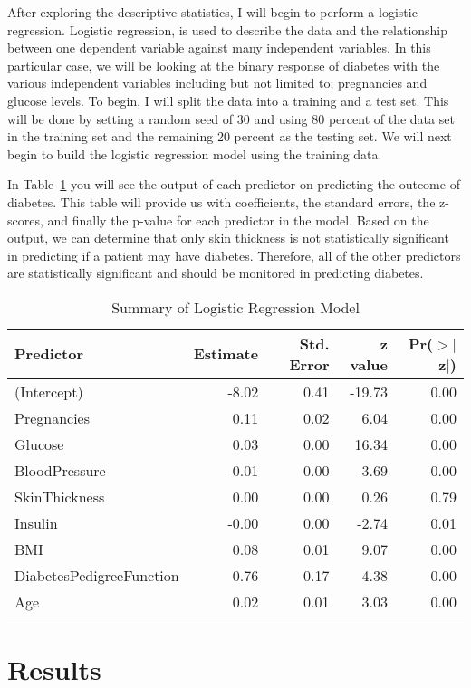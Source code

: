 \documentclass[12pt]{article}
\begin{document}
    After exploring the descriptive statistics, I will begin to perform a logistic regression. Logistic regression, is used to describe the data and the relationship between one dependent variable against many independent variables. In this particular case, we will be looking at the binary response of diabetes with the various independent variables including but not limited to; pregnancies and glucose levels. To begin, I will split the data into a training and a test set. This will be done by setting a random seed of 30 and using 80 percent of the data set in the training set and the remaining 20 percent as the testing set. We will next begin to build the logistic regression model using the training data. 
    
    In Table~\ref{tab:sl} you will see the output of each predictor on predicting the outcome of diabetes. This table will provide us with coefficients, the standard errors, the z-scores, and finally the p-value for each predictor in the model. Based on the output, we can determine that only skin thickness is not statistically significant in predicting if a patient may have diabetes. Therefore, all of the other predictors are statistically significant and should be monitored in predicting diabetes.



\begin{table}[ht]
    \caption{Summary of Logistic Regression Model}
    \label{tab:sl}
\centering
\begin{tabular}{lrrrr}
  \hline
Predictor & Estimate & Std. Error & z value & Pr($>$$|$z$|$) \\ 
  \hline
(Intercept) & -8.02 & 0.41 & -19.73 & 0.00 \\ 
  Pregnancies & 0.11 & 0.02 & 6.04 & 0.00 \\ 
  Glucose & 0.03 & 0.00 & 16.34 & 0.00 \\ 
  BloodPressure & -0.01 & 0.00 & -3.69 & 0.00 \\ 
  SkinThickness & 0.00 & 0.00 & 0.26 & 0.79 \\ 
  Insulin & -0.00 & 0.00 & -2.74 & 0.01 \\ 
  BMI & 0.08 & 0.01 & 9.07 & 0.00 \\ 
  DiabetesPedigreeFunction & 0.76 & 0.17 & 4.38 & 0.00 \\ 
  Age & 0.02 & 0.01 & 3.03 & 0.00 \\ 
   \hline
\end{tabular}
\end{table}
\section{Results}
\label{sec:resu}
\end{document}
